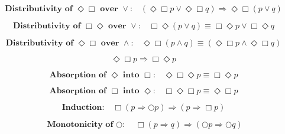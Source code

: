 \documentclass[fleqn, leqno]{article}
\newcommand{\Next}{\bigcirc}
\newcommand{\Event}{\Diamond}
\newcommand{\Always}{\Box}
\newcommand{\spacer}{\vspace{-30pt}}
\begin{document}
\begin{equation}\label{E:distEventAlwaysOr}
\textbf{Distributivity of $\Event\Always$ over $\lor$:}\quad (\Event\Always p \lor \Event\Always q) \Rightarrow \Event\Always (p \lor q)
\end{equation}

\spacer

\begin{equation}\label{E:distAlwaysEventOr}
\textbf{Distributivity of $\Always\Event$ over $\lor$:}\quad \Always\Event(p \lor q) \equiv \Always\Event p \lor \Always\Event q
\end{equation}

\spacer

\begin{equation}\label{E:distEventAlwaysAnd}
\textbf{Distributivity of $\Event\Always$ over $\land$:}\quad \Event\Always(p \land q) \equiv (\Event\Always p \land \Event\Always q)
\end{equation}

\spacer

\begin{equation}\label{E:eventAlwaysImp}
\Event\Always p \Rightarrow \Always\Event p
\end{equation}

\spacer

\begin{equation}\label{E:absEvent}
\textbf{Absorption of $\Event$ into $\Always$:}\quad \Event\Always\Event p \equiv \Always\Event p
\end{equation}

\spacer

\begin{equation}\label{E:absAlways}
\textbf{Absorption of $\Always$ into $\Event$:}\quad \Always\Event\Always p \equiv \Event\Always p
\end{equation}

\spacer

\begin{equation}\label{E:induction}
\textbf{Induction:}\quad \Always (p \Rightarrow \Next p) \Rightarrow (p \Rightarrow \Always p)
\end{equation}

\spacer

\begin{equation}\label{E:alwaysImpNexts}
\textbf{Monotonicity of $\Next$:}\quad \Always (p \Rightarrow q) \Rightarrow (\Next p \Rightarrow \Next q)
\end{equation}

\spacer
\end{document}
